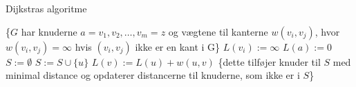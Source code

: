 \begin{algorithm}[H]
\caption{Dijkstras algoritme}
\begin{algorithmic}[1]

    \State \{$G$ {har knuderne $a = v_{1}, v_{2}, \dotsc, v_{m} = z$ og vægtene til kanterne $w(v_{i}, v_{j})$, hvor $w(v_{i}, v_{j}) = \infty$ hvis {$(v_{i}, v_{j})$} ikke er en kant i G\}}
		\State $L(v_{i}) := \infty$
	\EndFor
	\State $L(a) := 0$	
	\State $S := \emptyset$
        \State $S := S \cup \{u\}$
        	 {$L(v) := L(u) + w(u,v)$}
        	\State \{dette tilføjer knuder til $S$ med minimal 			distance og opdaterer distancerne til
        	\State knuderne, som ikke er i $S$\}
        	\EndIf
    	\EndFor
    \EndWhile
\EndProcedure

\end{algorithmic}
\label{alg:dijkstra}
\end{algorithm}